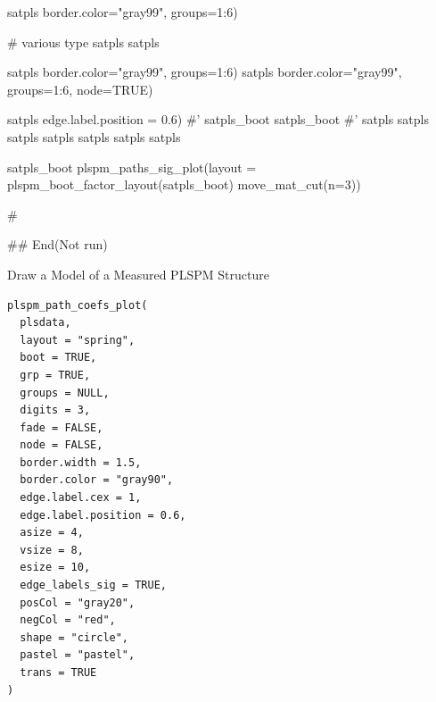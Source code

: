 \documentclass[a4paper]{book}
\begin{document}
\begin{Examples}
\begin{ExampleCode}
satpls %
                            border.color="gray99", groups=1:6)


# various type
satpls %
satpls %

satpls %
                                 border.color="gray99", groups=1:6)
satpls %
                                 border.color="gray99", groups=1:6, node=TRUE)

satpls %
                                 edge.label.position = 0.6)
#'
satpls_boot%
satpls_boot%
#'
satpls %
satpls %
satpls %
satpls %
satpls %
satpls %
satpls %

satpls_boot %
plspm_paths_sig_plot(layout =  plspm_boot_factor_layout(satpls_boot)%
 move_mat_cut(n=3))

#



## End(Not run)
\end{ExampleCode}
\end{Examples}
%
\begin{Description}
Draw a Model of a Measured PLSPM Structure
\end{Description}
%
\begin{Usage}
\begin{verbatim}
plspm_path_coefs_plot(
  plsdata,
  layout = "spring",
  boot = TRUE,
  grp = TRUE,
  groups = NULL,
  digits = 3,
  fade = FALSE,
  node = FALSE,
  border.width = 1.5,
  border.color = "gray90",
  edge.label.cex = 1,
  edge.label.position = 0.6,
  asize = 4,
  vsize = 8,
  esize = 10,
  edge_labels_sig = TRUE,
  posCol = "gray20",
  negCol = "red",
  shape = "circle",
  pastel = "pastel",
  trans = TRUE
)
\end{verbatim}
\end{Usage}
%
\end{document}
